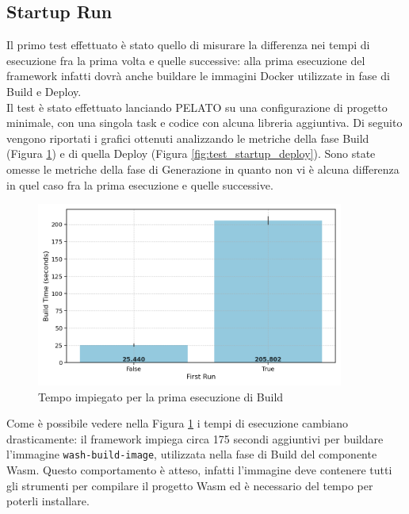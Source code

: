 \subsection{Startup Run}

Il primo test effettuato è stato quello di misurare la differenza nei tempi di esecuzione fra la prima volta e quelle successive: alla prima esecuzione del framework infatti dovrà anche buildare le immagini Docker utilizzate in fase di Build e Deploy.\\
Il test è stato effettuato lanciando PELATO su una configurazione di progetto minimale, con una singola task e codice con alcuna libreria aggiuntiva. Di seguito vengono riportati i grafici ottenuti analizzando le metriche della fase Build (Figura \ref{fig:test_startup_build}) e di quella Deploy (Figura \ref{fig:test_startup_deploy}). Sono state omesse le metriche della fase di Generazione in quanto non vi è alcuna differenza in quel caso fra la prima esecuzione e quelle successive.

\FloatBarrier
\begin{figure}[h]
    \centering
    \includegraphics[width=0.9\textwidth]{img/plots/barplot_startup_build.png}
    \caption{Tempo impiegato per la prima esecuzione di Build}
    \label{fig:test_startup_build}
\end{figure}
\FloatBarrier

Come è possibile vedere nella Figura \ref{fig:test_startup_build} i tempi di esecuzione cambiano drasticamente: il framework impiega circa 175 secondi aggiuntivi per buildare l'immagine \texttt{wash-build-image}, utilizzata nella fase di Build del componente Wasm. Questo comportamento è atteso, infatti l'immagine deve contenere tutti gli strumenti per compilare il progetto Wasm ed è necessario del tempo per poterli installare.

